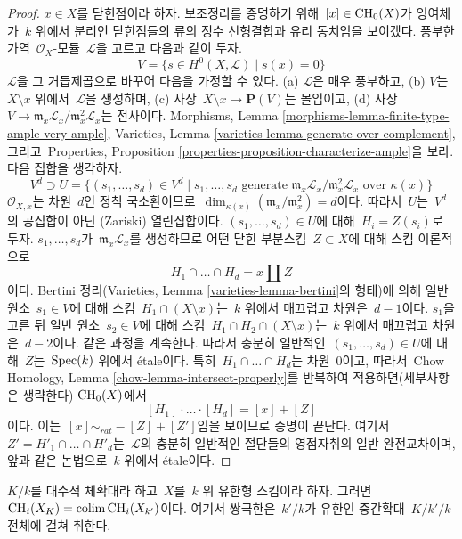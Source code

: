 \begin{proof}
\medskip\noindent
$x \in X$를 닫힌점이라 하자. 보조정리를 증명하기 위해\ 
$[x] \in \mathop{\mathrm{CH}}\nolimits_0(X)$가 잉여체가\  $k$ 위에서 분리인 닫힌점들의 류의
정수 선형결합과 유리 동치임을 보이겠다. 풍부한 가역\ 
$\mathcal{O}_X$-모듈\  $\mathcal{L}$을 고르고 다음과 같이 두자.
$$
V = \{s \in H^0(X, \mathcal{L}) \mid s(x) = 0 \}
$$
$\mathcal{L}$을 그 거듭제곱으로 바꾸어 다음을 가정할 수 있다.
(a) $\mathcal{L}$은 매우 풍부하고, (b) $V$는\  $X \setminus x$ 위에서\ 
$\mathcal{L}$을 생성하며, (c) 사상\ 
$X \setminus x \to \mathbf{P}(V)$는 몰입이고, (d) 사상\ 
$V \to \mathfrak m_x\mathcal{L}_x/\mathfrak m_x^2\mathcal{L}_x$는
전사이다. Morphisms, Lemma
\ref{morphisms-lemma-finite-type-ample-very-ample}, Varieties, Lemma
\ref{varieties-lemma-generate-over-complement}, 그리고\  Properties,
Proposition \ref{properties-proposition-characterize-ample}을 보라.
다음 집합을 생각하자.
$$
V^d \supset U =
\{
(s_1, \ldots, s_d) \in V^d \mid s_1, \ldots, s_d
\text{ generate }
\mathfrak m_x\mathcal{L}_x/\mathfrak m_x^2\mathcal{L}_x
\text{ over }\kappa(x)
\}
$$
$\mathcal{O}_{X, x}$는 차원\  $d$인 정칙 국소환이므로\ 
$\dim_{\kappa(x)}(\mathfrak m_x/\mathfrak m_x^2) = d$이다.
따라서\  $U$는\  $V^d$의 공집합이 아닌 (Zariski) 열린집합이다.
$(s_1, \ldots, s_d) \in U$에 대해\  $H_i = Z(s_i)$로 두자.
$s_1, \ldots, s_d$가\  $\mathfrak m_x\mathcal{L}_x$를 생성하므로
어떤 닫힌 부분스킴\  $Z \subset X$에 대해 스킴 이론적으로
$$
H_1 \cap \ldots \cap H_d = x \amalg Z
$$
이다. Bertini 정리(Varieties, Lemma
\ref{varieties-lemma-bertini}의 형태)에 의해 일반 원소\ 
$s_1 \in V$에 대해 스킴\  $H_1 \cap (X \setminus x)$는\ 
$k$ 위에서 매끄럽고 차원은\  $d - 1$이다. $s_1$을 고른 뒤 일반 원소\ 
$s_2 \in V$에 대해 스킴\  $H_1 \cap H_2 \cap (X \setminus x)$는\ 
$k$ 위에서 매끄럽고 차원은\  $d - 2$이다. 같은 과정을 계속한다.
따라서 충분히 일반적인\  $(s_1, \ldots, s_d) \in U$에 대해\ 
$Z$는\  $\mathop{\mathrm{Spec}}(k)$ 위에서 \'etale이다. 특히\ 
$H_1 \cap \ldots \cap H_d$는 차원\  $0$이고, 따라서\ 
Chow Homology, Lemma \ref{chow-lemma-intersect-properly}를 반복하여
적용하면(세부사항은 생략한다) $\mathop{\mathrm{CH}}\nolimits_0(X)$에서
$$
[H_1] \cdot \ldots \cdot [H_d] = [x] + [Z]
$$
이다. 이는\  $[x] \sim_{rat} - [Z] + [Z']$임을 보이므로 증명이 끝난다.
여기서\  $Z' = H'_1 \cap \ldots \cap H'_d$는\  $\mathcal{L}$의 충분히
일반적인 절단들의 영점자취의 일반 완전교차이며, 앞과 같은 논법으로\ 
$k$ 위에서 \'etale이다.
\end{proof}

\begin{lemma}
\label{lemma-chow-limit}
$K/k$를 대수적 체확대라 하고\  $X$를\  $k$ 위 유한형 스킴이라 하자.
그러면\  $\mathop{\mathrm{CH}}\nolimits_i(X_K) = \mathop{\mathrm{colim}}\nolimits \mathop{\mathrm{CH}}\nolimits_i(X_{k'})$이다. 여기서 쌍극한은\ 
$k'/k$가 유한인 중간확대\  $K/k'/k$ 전체에 걸쳐 취한다.
\end{lemma}

